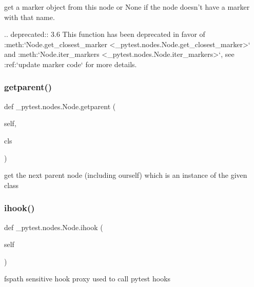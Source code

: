 \begin{DoxyVerb}get a marker object from this node or None if
the node doesn't have a marker with that name.

.. deprecated:: 3.6
    This function has been deprecated in favor of
    :meth:`Node.get_closest_marker <_pytest.nodes.Node.get_closest_marker>` and
    :meth:`Node.iter_markers <_pytest.nodes.Node.iter_markers>`, see :ref:`update marker code`
    for more details.
\end{DoxyVerb}
 \mbox{\label{class__pytest_1_1nodes_1_1_node_a229a78c0bd7a10e8acebe1fe037d2a91}} 
\subsubsection{\texorpdfstring{getparent()}{getparent()}}
{\footnotesize\ttfamily def \+\_\+pytest.\+nodes.\+Node.\+getparent (\begin{DoxyParamCaption}\item[{}]{self,  }\item[{}]{cls }\end{DoxyParamCaption})}

\begin{DoxyVerb}get the next parent node (including ourself)
which is an instance of the given class\end{DoxyVerb}
 \mbox{\label{class__pytest_1_1nodes_1_1_node_a33620824e3aa925412302590d53ea608}} 
\subsubsection{\texorpdfstring{ihook()}{ihook()}}
{\footnotesize\ttfamily def \+\_\+pytest.\+nodes.\+Node.\+ihook (\begin{DoxyParamCaption}\item[{}]{self }\end{DoxyParamCaption})}

\begin{DoxyVerb}fspath sensitive hook proxy used to call pytest hooks\end{DoxyVerb}
 \mbox{\label{class__pytest_1_1nodes_1_1_node_a6907ee44236e82a68ac370c11a48171a}} 
